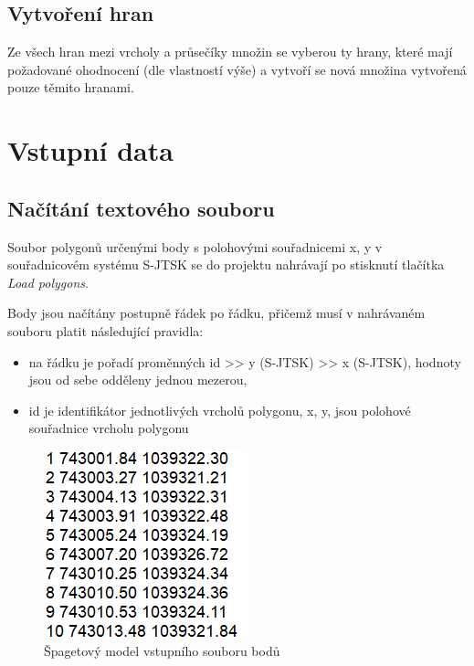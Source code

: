 \documentclass[11pt]{article}
\begin{document}
\subsection{Vytvoření hran}
Ze všech hran mezi vrcholy a průsečíky množin se vyberou ty hrany, které mají požadované ohodnocení (dle vlastností výše) a vytvoří se nová množina vytvořená pouze těmito hranami.


 



\section{Vstupní data}
\subsection{Načítání textového souboru}

Soubor polygonů určenými body s polohovými souřadnicemi x, y v souřadnicovém systému S-JTSK se do projektu nahrávají po stisknutí  tlačítka \textit{Load polygons}.

Body jsou načítány postupně řádek po řádku, přičemž musí v nahrávaném souboru platit následující pravidla:    

\begin{itemize}
\item na řádku je pořadí proměnných id >> y (S-JTSK) >> x (S-JTSK),  hodnoty jsou od sebe odděleny jednou mezerou,
\item id je identifikátor jednotlivých vrcholů polygonu, x, y, jsou polohové souřadnice vrcholu polygonu

\end{itemize}

\begin{figure}[htbh]
	\centering	
	\includegraphics[scale=1]{images/vstup_polygon.png} 
	\caption{Špagetový model vstupního souboru bodů}
	\label{fig:vstup.}
\end{figure} 
\FloatBarrier
\end{document}
